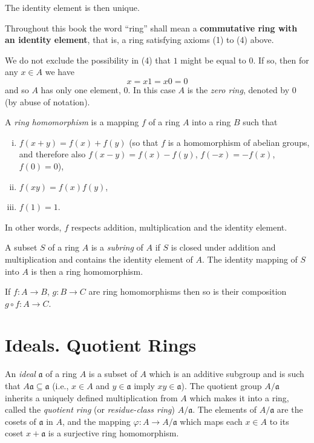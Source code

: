 The identity element is then unique.

Throughout this book the word ``ring'' shall mean a \textbf{commutative ring with an identity element}, that is, a ring satisfying axioms (1) to (4) above.

\begin{remark}
We do not exclude the possibility in (4) that $1$ might be equal to $0$. If so, then for any $x \in A$ we have
\[
    x = x1 = x0 = 0
\]
and so $A$ has only one element, $0$. In this case $A$ is the \emph{zero ring}, denoted by $0$ (by abuse of notation).
\end{remark}

A \emph{ring homomorphism} is a mapping $f$ of a ring $A$ into a ring $B$ such that
\begin{enumerate}[i)]
    \item $f(x + y) = f(x) + f(y)$ (so that $f$ is a homomorphism of abelian groups, and therefore also $f(x - y) = f(x) - f(y)$, $f(-x) = -f(x)$, $f(0) = 0$),
    \item $f(xy) = f(x)f(y)$,
    \item $f(1) = 1$.
\end{enumerate}

In other words, $f$ respects addition, multiplication and the identity element.

A subset $S$ of a ring $A$ is a \emph{subring} of $A$ if $S$ is closed under addition and multiplication and contains the identity element of $A$. The identity mapping of $S$ into $A$ is then a ring homomorphism.

If $f \colon A \to B$, $g \colon B \to C$ are ring homomorphisms then so is their composition $g \circ f \colon A \to C$.


\section*{Ideals. Quotient Rings}

An \emph{ideal} $\mathfrak{a}$ of a ring $A$ is a subset of $A$ which is an additive subgroup and is such that $A\mathfrak{a} \subseteq \mathfrak{a}$ (i.e., $x \in A$ and $y \in \mathfrak{a}$ imply $xy \in \mathfrak{a}$). The quotient group $A/\mathfrak{a}$ inherits a uniquely defined multiplication from $A$ which makes it into a ring, called the \emph{quotient ring} (or \emph{residue-class ring}) $A/\mathfrak{a}$. The elements of $A/\mathfrak{a}$ are the cosets of $\mathfrak{a}$ in $A$, and the mapping $\varphi \colon A \to A/\mathfrak{a}$ which maps each $x \in A$ to its coset $x + \mathfrak{a}$ is a surjective ring homomorphism.

